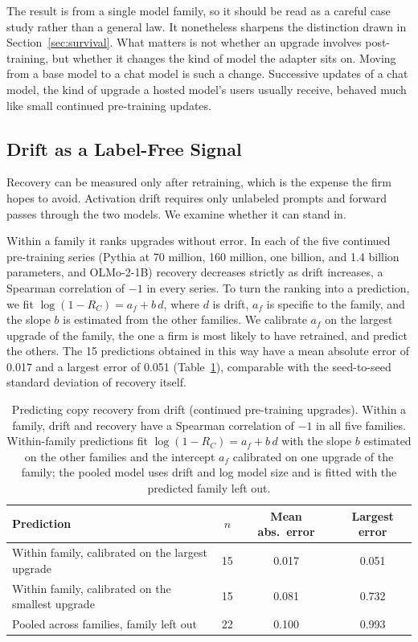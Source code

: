 \documentclass[ijds,blindrev]{informs4}
\begin{document}
The result is from a single model family, so it should be read as a careful case study rather than a general law. It nonetheless sharpens the distinction drawn in Section~\ref{sec:survival}. What matters is not whether an upgrade involves post-training, but whether it changes the kind of model the adapter sits on. Moving from a base model to a chat model is such a change. Successive updates of a chat model, the kind of upgrade a hosted model's users usually receive, behaved much like small continued pre-training updates.

\subsection{Drift as a Label-Free Signal}\label{sec:drift}

Recovery can be measured only after retraining, which is the expense the firm hopes to avoid. Activation drift requires only unlabeled prompts and forward passes through the two models. We examine whether it can stand in.

Within a family it ranks upgrades without error. In each of the five continued pre-training series (Pythia at 70 million, 160 million, one billion, and 1.4 billion parameters, and OLMo-2-1B) recovery decreases strictly as drift increases, a Spearman correlation of $-1$ in every series. To turn the ranking into a prediction, we fit $\log(1-R_C)=a_f+b\,d$, where $d$ is drift, $a_f$ is specific to the family, and the slope $b$ is estimated from the other families. We calibrate $a_f$ on the largest upgrade of the family, the one a firm is most likely to have retrained, and predict the others. The 15 predictions obtained in this way have a mean absolute error of 0.017 and a largest error of 0.051 (Table~\ref{tab:drift}), comparable with the seed-to-seed standard deviation of recovery itself.

\begin{table}[t]
\centering
\caption{Predicting copy recovery from drift (continued pre-training upgrades). Within a family, drift and recovery have a Spearman correlation of $-1$ in all five families. Within-family predictions fit $\log(1-R_C)=a_f+b\,d$ with the slope $b$ estimated on the other families and the intercept $a_f$ calibrated on one upgrade of the family; the pooled model uses drift and log model size and is fitted with the predicted family left out.}\label{tab:drift}
\small
\begin{tabular}{lccc}
\toprule
Prediction & $n$ & Mean abs.\ error & Largest error\\
\midrule
Within family, calibrated on the largest upgrade & 15 & 0.017 & 0.051\\
Within family, calibrated on the smallest upgrade & 15 & 0.081 & 0.732\\
Pooled across families, family left out & 22 & 0.100 & 0.993\\
\bottomrule
\end{tabular}
\end{table}
\end{document}
